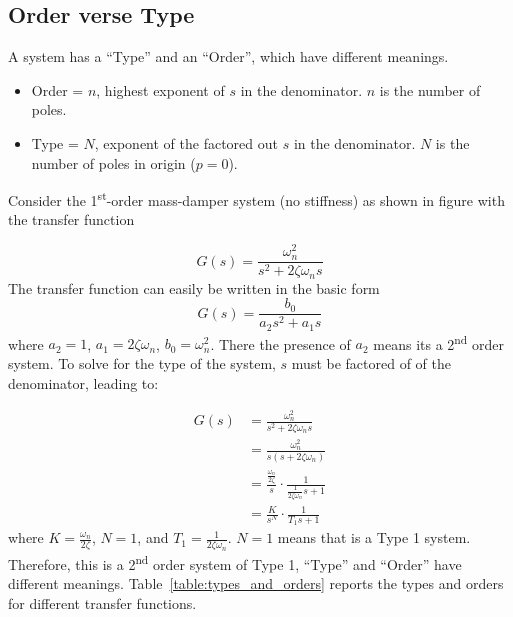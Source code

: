 \documentclass[12pt,letter]{article}
\begin{document}
\subsection{Order verse Type}


A system has a ``Type'' and an ``Order'', which have different meanings. 
\begin{itemize}[noitemsep,topsep=0pt]
\item Order = $n$, highest exponent of $s$ in the denominator. $n$ is the number of poles.
\item Type = $N$, exponent of the factored out $s$ in the denominator. $N$ is the number of poles in origin ($p=0$). 
\end{itemize}

Consider the 1\textsuperscript{st}-order mass-damper system (no stiffness) as shown in figure  with the transfer function


\begin{equation}
G(s) = \frac{\omega_n^2}{s^2 + 2 \zeta \omega_n s} 
\end{equation}
The transfer function can easily be written in the basic form 
\begin{equation}
G(s) = \frac{b_0}{a_2s^2+a_1s}
\end{equation}
where $a_2=1$, $a_1=2 \zeta \omega_n$, $b_0 = \omega_n^2$. There the presence of $a_2$ means its a 2\textsuperscript{nd} order system. To solve for the type of the system, $s$ must be factored of of the denominator, leading to:

\begin{align}
G(s) &= \frac{\omega_n^2}{s^2 + 2 \zeta \omega_n s} \\
&= \frac{\omega_n^2}{s(s+2 \zeta \omega_n)} \nonumber \\
&= \frac{\frac{\omega_n}{2 \zeta}}{s} \cdot \frac{1}{\frac{1}{2 \zeta \omega_n}s+1} \nonumber \\
&= \frac{K}{s^N} \cdot \frac{1}{T_1s+1} \nonumber
\end{align}
where $K=\frac{\omega_n}{2 \zeta}$, $N=1$, and $T_1 = \frac{1}{2 \zeta \omega_n}$. $N=1$ means that is a Type 1 system. Therefore, this is a 2\textsuperscript{nd} order system of Type 1, ``Type'' and ``Order'' have different meanings. Table~\ref{table:types_and_orders} reports the types and orders for different transfer functions.
\end{document}

